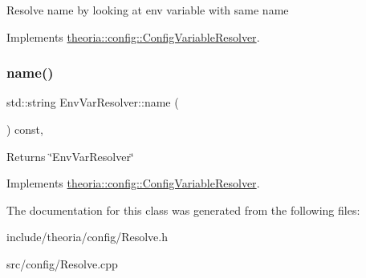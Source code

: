 Resolve name by looking at env variable with same name 

Implements \hyperlink{classtheoria_1_1config_1_1ConfigVariableResolver}{theoria\+::config\+::\+Config\+Variable\+Resolver}.

\mbox{\label{classtheoria_1_1config_1_1EnvVarResolver_ab2c250e1b7866dcd618dc90f3c3eab19}} 
\subsubsection{\texorpdfstring{name()}{name()}}
{\footnotesize\ttfamily std\+::string Env\+Var\+Resolver\+::name (\begin{DoxyParamCaption}{ }\end{DoxyParamCaption}) const\hspace{0.3cm}{\ttfamily [override]}, {\ttfamily [virtual]}}

Returns \char`\"{}\+Env\+Var\+Resolver\char`\"{} 

Implements \hyperlink{classtheoria_1_1config_1_1ConfigVariableResolver_a026bda729faf988eaef334a45ec92303}{theoria\+::config\+::\+Config\+Variable\+Resolver}.



The documentation for this class was generated from the following files\+:\begin{DoxyCompactItemize}
\item 
include/theoria/config/Resolve.\+h\item 
src/config/Resolve.\+cpp\end{DoxyCompactItemize}
